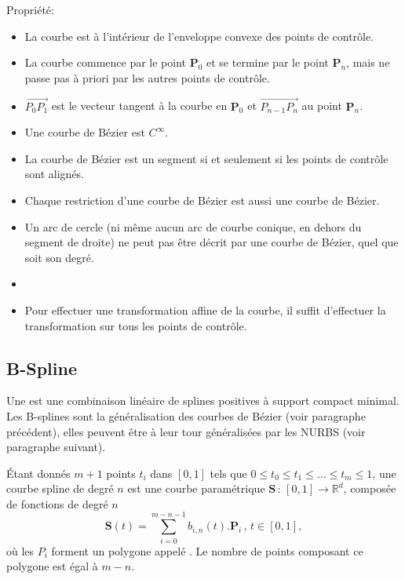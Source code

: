 \medskip
Propriété:
\begin{itemize}
   \item La courbe est à l'intérieur de l'enveloppe convexe des points de contrôle.
   \item La courbe commence par le point $\mathbf{P}_0$ et se termine par le point $\mathbf{P}_n$, 
	mais ne passe pas à priori par les autres points de contrôle.
   \item $\overrightarrow{P_0P_1}$ est le vecteur tangent à la courbe en $\mathbf{P}_0$ et
	$\overrightarrow{P_{n-1}P_n}$ au point $\mathbf{P}_n$.
   \item Une courbe de Bézier est $C^{\infty}$.
   \item La courbe de Bézier est un segment si et seulement si les points de contrôle sont alignés.
   \item Chaque restriction d'une courbe de Bézier est aussi une courbe de Bézier.
   \item Un arc de cercle (ni même aucun arc de courbe conique, en dehors du segment de droite) ne peut pas 
	être décrit par une courbe de Bézier, quel que soit son degré.
   \item {}
   \item Pour effectuer une transformation affine de la courbe, il suffit d'effectuer la transformation sur tous 
	les points de contrôle.
\end{itemize}


\medskip
\subsection{B-Spline}

Une  est une combinaison linéaire de splines positives à support compact minimal. 
Les B-splines sont la généralisation des courbes de Bézier (voir paragraphe précédent), elles peuvent être 
à leur tour généralisées par les NURBS (voir paragraphe suivant).

\medskip
Étant donnés $m+1$ points $t_i$ dans $[0, 1]$ tels que $0 \le t_0 \le t_1 \le \ldots \le t_m \le 1$,
une courbe spline de degré $n$ est une courbe paramétrique $\mathbf{S} \,:\, [0,1] \to \mathbb{R}^d$,
composée de fonctions  de degré $n$
\begin{equation}
    \mathbf{S}(t) = \sum_{i = 0}^{m - n - 1} b_{i, n} (t) . \mathbf{P}_{i} \,,\, t \in [0, 1],
\end{equation}
où les $P_i$ forment un polygone appelé . 
Le nombre de points composant ce polygone est égal à $m-n$.

